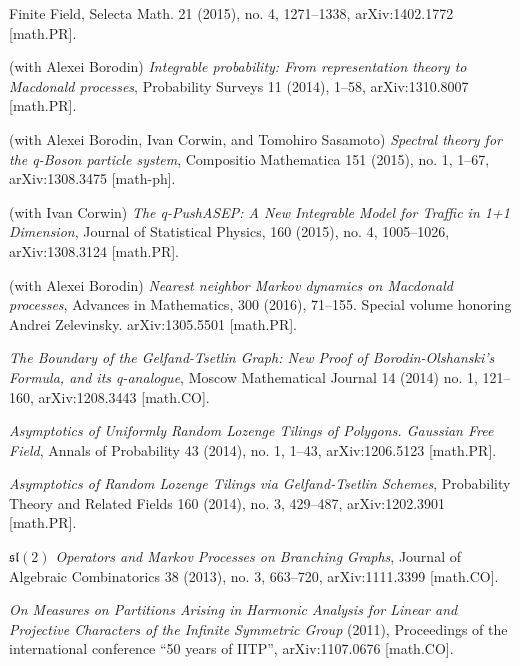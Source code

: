 \documentclass[letterpaper,11pt]{article}
\begin{document}
\begin{etaremune}
{		      Finite
		      Field},
	      Selecta Math. 21 (2015), no. 4,
	      1271--1338,
	      arXiv:1402.1772 [math.PR].
	\item
	      (with Alexei Borodin)
	      \emph{Integrable probability: From representation theory to
		      Macdonald
		      processes},
	      Probability Surveys 11 (2014), 1--58, arXiv:1310.8007 [math.PR].
	\item
	      (with Alexei Borodin, Ivan Corwin, and Tomohiro Sasamoto)
	      \emph{Spectral theory for the q-Boson particle system},
	      Compositio Mathematica 151 (2015), no. 1, 1--67,
	      arXiv:1308.3475 [math-ph].
	\item
	      (with Ivan Corwin)
	      \emph{The q-PushASEP: A New Integrable Model for Traffic in 1+1
		      Dimension},
	      Journal of Statistical Physics,
	      160 (2015), no. 4, 1005--1026,
	      arXiv:1308.3124 [math.PR].
	\item
	      (with Alexei Borodin)
	      \emph{Nearest neighbor Markov dynamics on
		      Macdonald processes},
	      Advances in Mathematics, 300 (2016), 71--155. Special volume
	      honoring
	      Andrei Zelevinsky.
	      arXiv:1305.5501 [math.PR].
	\item
	      \emph{The Boundary of the Gelfand-Tsetlin Graph: New Proof of
		      Borodin-Olshanski's Formula, and its q-analogue},
	      Moscow Mathematical Journal 14 (2014) no. 1, 121--160,
	      arXiv:1208.3443 [math.CO].
	\item
	      \emph{Asymptotics of Uniformly Random Lozenge Tilings of
		      Polygons.
		      Gaussian Free Field},
	      Annals of Probability 43 (2014), no. 1, 1--43,
	      arXiv:1206.5123 [math.PR].
	\item
	      \emph{Asymptotics of Random Lozenge Tilings via Gelfand-Tsetlin
		      Schemes},
	      Probability Theory and Related Fields 160 (2014), no. 3,
	      429--487,
	      arXiv:1202.3901 [math.PR].
	\item
	      \emph{$\mathfrak{sl}(2)$%
		      Operators and Markov Processes on
		      Branching
		      Graphs},
	      Journal of Algebraic Combinatorics 38 (2013), no. 3, 663--720,
	      arXiv:1111.3399 [math.CO].
	\item
	      \emph{On Measures on Partitions Arising in Harmonic Analysis for
		      Linear and Projective Characters of the Infinite
		      Symmetric Group} (2011),
	      Proceedings of the international conference ``50 years of
	      IITP'',
	      arXiv:1107.0676 [math.CO].
	\item

\end{etaremune}
\end{document}
